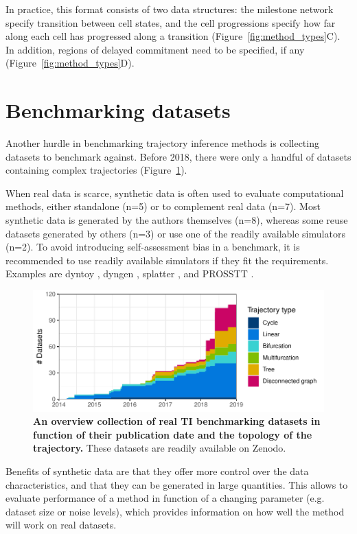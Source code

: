 In practice, this format consists of two data structures: the milestone network specify transition between cell states, and the cell progressions specify how far along each cell has progressed along a transition (Figure~\ref{fig:method_types}C). In addition, regions of delayed commitment need to be specified, if any (Figure~\ref{fig:method_types}D). 


\section{Benchmarking datasets}
Another hurdle in benchmarking trajectory inference methods is collecting datasets to benchmark against. Before 2018, there were only a handful of datasets containing complex trajectories (Figure~\ref{fig:datasets}). 

When real data is scarce, synthetic data is often used to evaluate computational methods, either standalone (n=5) or to complement real data (n=7). Most synthetic data is generated by the authors themselves (n=8), whereas some reuse datasets generated by others (n=3) or use one of the readily available simulators (n=2). To avoid introducing self-assessment bias in a benchmark, it is recommended to use readily available simulators if they fit the requirements. Examples are dyntoy \cite{saelens_comparisonsinglecelltrajectory_2019}, dyngen \cite{dyngen}, splatter \cite{zappia_splattersimulationsinglecell_2017}, and PROSSTT \cite{papadopoulos_prossttprobabilisticsimulation_2018}.

\begin{figure}[htb!]
	\centering
	\includegraphics[width=.75\linewidth]{fig/datasets.pdf} 
	\caption{\textbf{An overview collection of real TI benchmarking datasets in function of their publication date and the topology of the trajectory.} These datasets are readily available on Zenodo\cite{cannoodt_singlecellomicsdatasets_2018}.}
	\label{fig:datasets}
\end{figure}

Benefits of synthetic data are that they offer more control over the data characteristics, and that they can be generated in large quantities. This allows to evaluate performance of a method in function of a changing parameter (e.g. dataset size or noise levels), which provides information on how well the method will work on real datasets.

